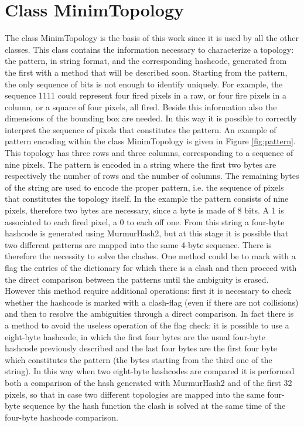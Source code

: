 \section{Class MinimTopology}
The class MinimTopology is the basis of this work since it is used by all the other classes. This class contains the information necessary to characterize a topology: the pattern, in string format, and the corresponding hashcode, generated from the first with a method that will be described soon. Starting from the pattern, the only sequence of bits is not enough to identify uniquely. For example, the sequence 1111 could represent four fired pixels in a raw, or four fire pixels in a column, or a square of four pixels, all fired. Beside this information also the dimensions of the bounding box are needed. In this way it is possible to correctly interpret the sequence of pixels that constitutes the pattern. An example of pattern encoding within the class MinimTopology is given in Figure \ref{fig:pattern}. This topology has three rows and three columns, corresponding to a sequence of nine pixels. The pattern is encoded in a string where the first two bytes are respectively the number of rows and the number of columns. The remaining bytes of the string are used to encode the proper pattern, i.e. the sequence of pixels that constitutes the topology itself. In the example the pattern consists of nine pixels, therefore two bytes are necessary, since a byte is made of 8 bits. A 1 is associated to each fired pixel, a 0 to each off one. From this string a four-byte hashcode is generated using MurmurHash2, but at this stage it is possible that two different patterns are mapped into the same 4-byte sequence. There is therefore the necessity to solve the clashes. One method could be to mark with a flag the entries of the dictionary for which there is a clash and then proceed with the direct comparison between the patterns until the ambiguity is erased. However this method require additional operations: first it is necessary to check whether the hashcode is marked with a clash-flag (even if there are not collisions) and then to resolve the ambiguities through a direct comparison. In fact there is a method to avoid the useless operation of the flag check: it is possible to use a eight-byte hashcode, in which the first four bytes are the usual four-byte hashcode previously described and the last four bytes are the first four byte which constitutes the pattern (the bytes starting from the third one of the string). In this way when two eight-byte hashcodes are compared it is performed both a comparison of the hash generated with MurmurHash2 and of the first 32 pixels, so that in case two different topologies are mapped into the same four-byte sequence by the hash function the clash is solved at the same time of the four-byte hashcode comparison.

